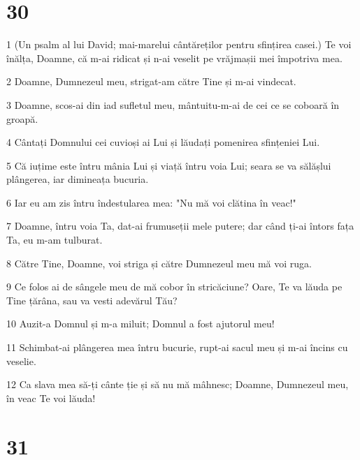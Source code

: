 \chapter{30}

\par 1 (Un psalm al lui David; mai-marelui cântăreților pentru sfințirea casei.) Te voi înălța, Doamne, că m-ai ridicat și n-ai veselit pe vrăjmașii mei împotriva mea.
\par 2 Doamne, Dumnezeul meu, strigat-am către Tine și m-ai vindecat.
\par 3 Doamne, scos-ai din iad sufletul meu, mântuitu-m-ai de cei ce se coboară în groapă.
\par 4 Cântați Domnului cei cuvioși ai Lui și lăudați pomenirea sfințeniei Lui.
\par 5 Că iuțime este întru mânia Lui și viață întru voia Lui; seara se va sălășlui plângerea, iar dimineața bucuria.
\par 6 Iar eu am zis întru îndestularea mea: "Nu mă voi clătina în veac!"
\par 7 Doamne, întru voia Ta, dat-ai frumuseții mele putere; dar când ți-ai întors fața Ta, eu m-am tulburat.
\par 8 Către Tine, Doamne, voi striga și către Dumnezeul meu mă voi ruga.
\par 9 Ce folos ai de sângele meu de mă cobor în stricăciune? Oare, Te va lăuda pe Tine țărâna, sau va vesti adevărul Tău?
\par 10 Auzit-a Domnul și m-a miluit; Domnul a fost ajutorul meu!
\par 11 Schimbat-ai plângerea mea întru bucurie, rupt-ai sacul meu și m-ai încins cu veselie.
\par 12 Ca slava mea să-ți cânte ție și să nu mă mâhnesc; Doamne, Dumnezeul meu, în veac Te voi lăuda!

\chapter{31}

